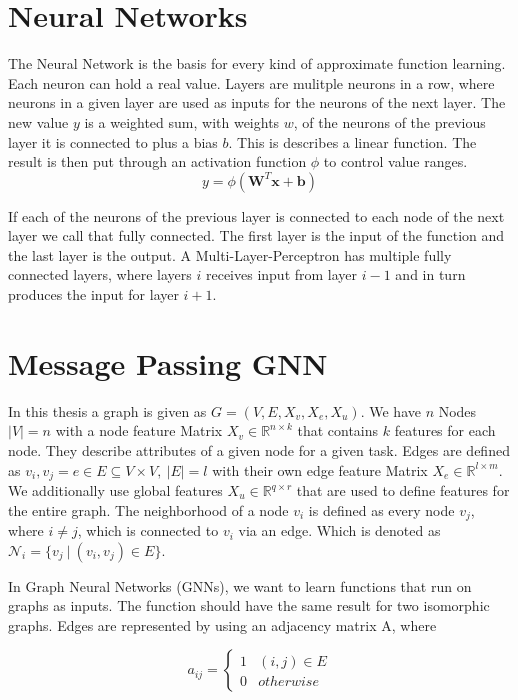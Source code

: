 \section{Neural Networks}
The Neural Network is the basis for every kind of approximate function learning. Each neuron can hold a real value. Layers are mulitple neurons in a row, where neurons in a given layer are used as inputs for the neurons of the next layer. The new value $y$ is a weighted  sum, with weights $w$, of the neurons of the previous layer it is connected to plus a bias $b$. This is describes a linear function. The result is then put through an activation function $\phi$ to control value ranges.
\begin{equation}
    y = \phi(\textbf{W}^T \textbf{x} + \textbf{b}) \nonumber
\end{equation} 

If each of the neurons of the previous layer is connected to each node of the next layer we call that fully connected. The first layer is the input of the function and the last layer is the output. A Multi-Layer-Perceptron has multiple fully connected layers, where layers $i$ receives input from layer $i-1$ and in turn produces the input for layer $i+1$.\par

\section{Message Passing GNN}
In this thesis a graph is given as $G=(V,E,X_v,X_e, X_u)$. We have $n$ Nodes $|V|=n$ with a node feature Matrix  $X_v \in \mathbb{R}^{n \times k}$ that contains $k$ features for each node. They describe attributes of a given node for a given task. Edges are defined as ${v_i,v_j} = e \in E \subseteq V \times V,\ |E| = l$ with their own edge feature Matrix $X_e \in \mathbb{R}^{l \times m}$. We additionally use global features $X_u \in \mathbb{R}^{q \times r}$ that are used to define features for the entire graph. The neighborhood of a node $v_i$ is defined as every node $v_j$, where $i \neq j$, which is connected to $v_i$ via an edge. Which is denoted as $\mathcal{N}_i = \{v_j\ |\ (v_i, v_j) \in E\}$. \par

In Graph Neural Networks (GNNs), we want to learn functions that run on graphs as inputs. The function should have the same result for two isomorphic graphs. Edges are represented by using an adjacency matrix A, where

\begin{equation}
    a_{ij} = \begin{cases} 1& (i,j) \in E \\ 0 & otherwise \end{cases} \nonumber
\end{equation}

